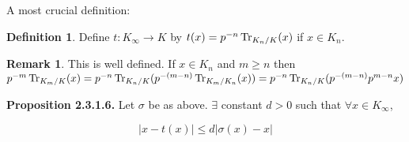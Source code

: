 \documentclass{article}
\theoremstyle{definition}
\newtheorem*{definition}{Definition}
\numberwithin{theorem}{subsection}
\newtheorem*{remark}{Remark}
\begin{document}
    A most crucial definition:

    \begin{definition}
        Define \(t: K_\infty \to K\) by \(t(x) = p^{-n} \Tr_{K_n / K}(x)\) if \(x\in K_n\).
    \end{definition}

    \begin{remark}
        This is well defined. If \(x \in K_n\) and \(m\geq n\) then \(p^{-m} \Tr_{K_m / K}(x) = p^{-n} \Tr_{K_n / K}(p^{-(m-n)} \Tr_{K_m / K_n}(x)) = p^{-n} \Tr_{K_n / K}(p^{-(m-n)} p^{m-n} x)\) 
    \end{remark}

    \textbf{Proposition 2.3.1.6.} Let \(\sigma\) be as above. \(\exists\) constant \(d > 0\) such that \(\forall x\in K_{\infty}\),

    \[
        \vert x - t(x) \vert \leq d \vert \sigma(x) - x \vert
    \]
\end{document}
